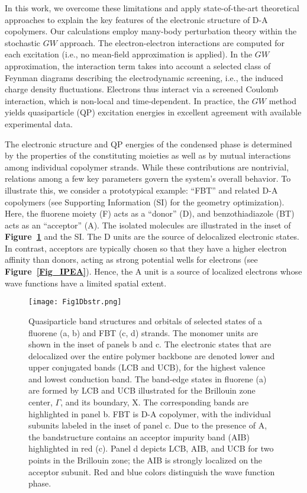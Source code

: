 \documentclass[journal = jpclcd]{achemso}
\begin{document}
In this work, we overcome these limitations and apply state-of-the-art theoretical approaches to explain the key features of the electronic structure of D-A copolymers.
Our calculations employ many-body perturbation theory\cite{martin_reining_ceperley_2016} within the stochastic $GW$ approach.\cite{Neuhauser2014,Vlcek2017,Vlcek2018,Vlcek2019} The electron-electron interactions are computed for each excitation (i.e., no mean-field approximation is applied). In the $GW$ approximation, the interaction term takes into account a selected class of Feynman diagrams describing the electrodynamic screening, i.e., the induced charge density fluctuations. Electrons thus interact via a screened Coulomb interaction, which is non-local and time-dependent. In practice, the $GW$ method yields quasiparticle (QP) excitation energies in excellent agreement with available experimental data.\cite{Blase2011,martin_reining_ceperley_2016,Vlcek2017}

The electronic structure and QP energies of the condensed phase is determined by the properties of the constituting moieties as well as by mutual interactions among individual copolymer strands.  While these contributions are nontrivial, relations among a few key parameters govern the system's overall behavior. To illustrate this, we consider a prototypical example:  ``FBT'' and related D-A copolymers\cite{Mai2013,Mai2015,Cui2018} (see Supporting Information (SI) for the geometry optimization). Here, the fluorene moiety (F) acts as a ``donor'' (D), and benzothiadiazole (BT) acts as an ``acceptor'' (A). The isolated molecules are illustrated in the inset of \textbf{Figure~\ref{Fig1Dbstr}} and the SI. The D units are the source of delocalized electronic states. In contrast, acceptors are typically chosen so that they have a higher electron affinity than donors\cite{Zhou2012,Duan2012}, acting as strong potential wells for electrons (see \textbf{Figure~\ref{Fig_IPEA}}).  Hence, the A unit is a source of localized electrons whose wave functions have a limited spatial extent. 

\begin{figure}
    \centering
    \texttt{[image: Fig1Dbstr.png]}
    \caption{Quasiparticle band structures and orbitals of selected states of a fluorene (a, b) and FBT (c, d) strands. The monomer units are shown in the inset of panels b and c. The electronic states that are delocalized over the entire polymer backbone are denoted lower and upper conjugated bands (LCB and UCB), for the highest valence and lowest conduction band. The band-edge states in fluorene (a) are formed by LCB and UCB illustrated for the Brillouin zone center, $\Gamma$,  and its boundary, X. The corresponding bands are highlighted in panel b. FBT is D-A copolymer, with the individual subunits labeled in the inset of panel c. Due to the presence of A, the bandstructure contains an acceptor impurity band (AIB) highlighted in red (c). Panel d depicts LCB, AIB, and UCB for two points in the Brillouin zone; the AIB is strongly localized on the acceptor subunit. Red and blue colors distinguish the wave function phase.} 
    \label{Fig1Dbstr}
\end{figure}
\end{document}
